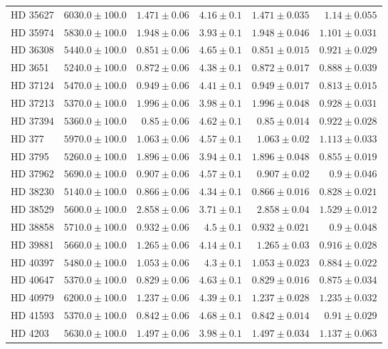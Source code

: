 \begin{longtable*}{lrrrrr}
HD 35627 & $6030.0\pm 100.0$ & $1.471\pm 0.06$ & $4.16\pm 0.1$ & $1.471\pm 0.035$ & $1.14\pm 0.055$ \\ 
HD 35974 & $5830.0\pm 100.0$ & $1.948\pm 0.06$ & $3.93\pm 0.1$ & $1.948\pm 0.046$ & $1.101\pm 0.031$ \\ 
HD 36308 & $5440.0\pm 100.0$ & $0.851\pm 0.06$ & $4.65\pm 0.1$ & $0.851\pm 0.015$ & $0.921\pm 0.029$ \\ 
HD 3651 & $5240.0\pm 100.0$ & $0.872\pm 0.06$ & $4.38\pm 0.1$ & $0.872\pm 0.017$ & $0.888\pm 0.039$ \\ 
HD 37124 & $5470.0\pm 100.0$ & $0.949\pm 0.06$ & $4.41\pm 0.1$ & $0.949\pm 0.017$ & $0.813\pm 0.015$ \\ 
HD 37213 & $5370.0\pm 100.0$ & $1.996\pm 0.06$ & $3.98\pm 0.1$ & $1.996\pm 0.048$ & $0.928\pm 0.031$ \\ 
HD 37394 & $5360.0\pm 100.0$ & $0.85\pm 0.06$ & $4.62\pm 0.1$ & $0.85\pm 0.014$ & $0.922\pm 0.028$ \\ 
HD 377 & $5970.0\pm 100.0$ & $1.063\pm 0.06$ & $4.57\pm 0.1$ & $1.063\pm 0.02$ & $1.113\pm 0.033$ \\ 
HD 3795 & $5260.0\pm 100.0$ & $1.896\pm 0.06$ & $3.94\pm 0.1$ & $1.896\pm 0.048$ & $0.855\pm 0.019$ \\ 
HD 37962 & $5690.0\pm 100.0$ & $0.907\pm 0.06$ & $4.57\pm 0.1$ & $0.907\pm 0.02$ & $0.9\pm 0.046$ \\ 
HD 38230 & $5140.0\pm 100.0$ & $0.866\pm 0.06$ & $4.34\pm 0.1$ & $0.866\pm 0.016$ & $0.828\pm 0.021$ \\ 
HD 38529 & $5600.0\pm 100.0$ & $2.858\pm 0.06$ & $3.71\pm 0.1$ & $2.858\pm 0.04$ & $1.529\pm 0.012$ \\ 
HD 38858 & $5710.0\pm 100.0$ & $0.932\pm 0.06$ & $4.5\pm 0.1$ & $0.932\pm 0.021$ & $0.9\pm 0.048$ \\ 
HD 39881 & $5660.0\pm 100.0$ & $1.265\pm 0.06$ & $4.14\pm 0.1$ & $1.265\pm 0.03$ & $0.916\pm 0.028$ \\ 
HD 40397 & $5480.0\pm 100.0$ & $1.053\pm 0.06$ & $4.3\pm 0.1$ & $1.053\pm 0.023$ & $0.884\pm 0.022$ \\ 
HD 40647 & $5370.0\pm 100.0$ & $0.829\pm 0.06$ & $4.63\pm 0.1$ & $0.829\pm 0.016$ & $0.875\pm 0.034$ \\ 
HD 40979 & $6200.0\pm 100.0$ & $1.237\pm 0.06$ & $4.39\pm 0.1$ & $1.237\pm 0.028$ & $1.235\pm 0.032$ \\ 
HD 41593 & $5370.0\pm 100.0$ & $0.842\pm 0.06$ & $4.68\pm 0.1$ & $0.842\pm 0.014$ & $0.91\pm 0.029$ \\ 
HD 4203 & $5630.0\pm 100.0$ & $1.497\pm 0.06$ & $3.98\pm 0.1$ & $1.497\pm 0.034$ & $1.137\pm 0.063$ \\ 

\end{longtable*}
